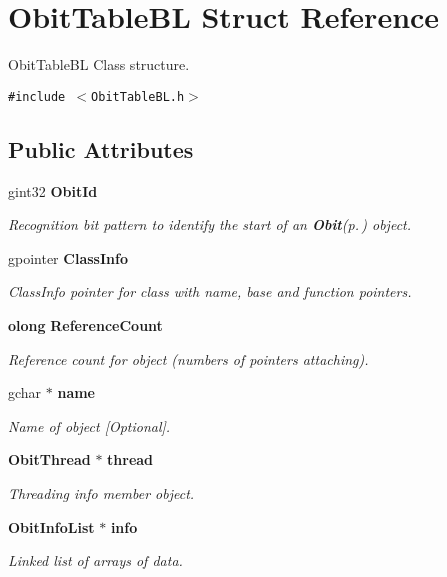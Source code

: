 \section{Obit\-Table\-BL Struct Reference}
\label{structObitTableBL}
Obit\-Table\-BL Class structure.  


{\tt \#include $<$Obit\-Table\-BL.h$>$}

\subsection*{Public Attributes}
\begin{CompactItemize}
\item 
gint32 {\bf Obit\-Id}
\begin{CompactList}\small\item\em Recognition bit pattern to identify the start of an {\bf Obit}{\rm (p.\,\pageref{structObit})} object. \item\end{CompactList}\item 
gpointer {\bf Class\-Info}
\begin{CompactList}\small\item\em Class\-Info pointer for class with name, base and function pointers. \item\end{CompactList}\item 
{\bf olong} {\bf Reference\-Count}
\begin{CompactList}\small\item\em Reference count for object (numbers of pointers attaching). \item\end{CompactList}\item 
gchar $\ast$ {\bf name}
\begin{CompactList}\small\item\em Name of object [Optional]. \item\end{CompactList}\item 
{\bf Obit\-Thread} $\ast$ {\bf thread}
\begin{CompactList}\small\item\em Threading info member object. \item\end{CompactList}\item 
{\bf Obit\-Info\-List} $\ast$ {\bf info}
\begin{CompactList}\small\item\em Linked list of arrays of data. \item\end{CompactList}\item 

\end{CompactItemize}
